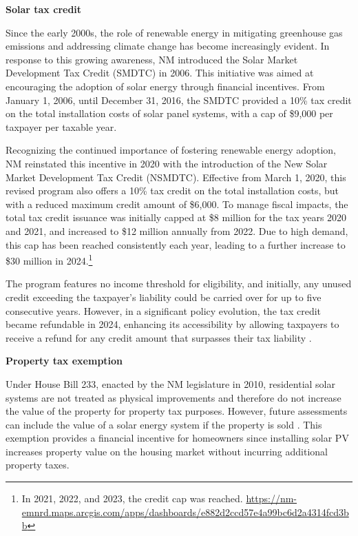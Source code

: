 \documentclass[12pt,twoside,letterpaper]{article}
\begin{document}
\textbf{Solar tax credit}

Since the early 2000s, the role of renewable energy in mitigating greenhouse gas emissions and addressing climate change has become increasingly evident. In response to this growing awareness, NM introduced the Solar Market Development Tax Credit (SMDTC) in 2006. This initiative was aimed at encouraging the adoption of solar energy through financial incentives. From January 1, 2006, until December 31, 2016, the SMDTC provided a 10\% tax credit on the total installation costs of solar panel systems, with a cap of \$9,000 per taxpayer per taxable year. 

Recognizing the continued importance of fostering renewable energy adoption, NM reinstated this incentive in 2020 with the introduction of the New Solar Market Development Tax Credit (NSMDTC). Effective from March 1, 2020, this revised program also offers a 10\% tax credit on the total installation costs, but with a reduced maximum credit amount of \$6,000. To manage fiscal impacts, the total tax credit issuance was initially capped at \$8 million for the tax years 2020 and 2021, and increased to \$12 million annually from 2022. Due to high demand, this cap has been reached consistently each year, leading to a further increase to \$30 million in 2024.\footnote{In 2021, 2022, and 2023, the credit cap was reached. \url{https://nm-emnrd.maps.arcgis.com/apps/dashboards/e882d2ccd57e4a99bc6d2a4314fcd3bb}}

The program features no income threshold for eligibility, and initially, any unused credit exceeding the taxpayer’s liability could be carried over for up to five consecutive years. However, in a significant policy evolution, the tax credit became refundable in 2024, enhancing its accessibility by allowing taxpayers to receive a refund for any credit amount that surpasses their tax liability \parencite{nmsmdtc}.

\noindent\textbf{Property tax exemption}

Under House Bill 233, enacted by the NM legislature in 2010, residential solar systems are not treated as physical improvements and therefore do not increase the value of the property for property tax purposes. However, future assessments can include the value of a solar energy system if the property is sold \parencite{propertytax}. This exemption provides a financial incentive for homeowners since installing solar PV increases property value on the housing market without incurring additional property taxes.
\end{document}
